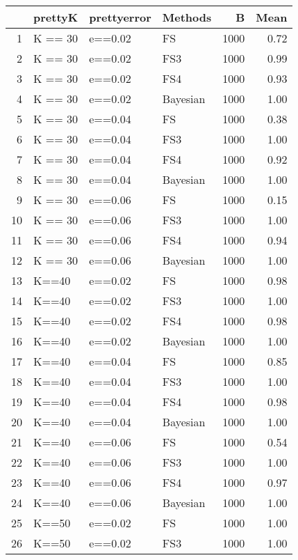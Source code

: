 \begin{table}[ht]
\centering
\begin{tabular}{rlllrr}
  \hline
 & prettyK & prettyerror & Methods & B & Mean \\ 
  \hline
1 & K == 30 & e==0.02 & FS & 1000 & 0.72 \\ 
  2 & K == 30 & e==0.02 & FS3 & 1000 & 0.99 \\ 
  3 & K == 30 & e==0.02 & FS4 & 1000 & 0.93 \\ 
  4 & K == 30 & e==0.02 & Bayesian & 1000 & 1.00 \\ 
  5 & K == 30 & e==0.04 & FS & 1000 & 0.38 \\ 
  6 & K == 30 & e==0.04 & FS3 & 1000 & 1.00 \\ 
  7 & K == 30 & e==0.04 & FS4 & 1000 & 0.92 \\ 
  8 & K == 30 & e==0.04 & Bayesian & 1000 & 1.00 \\ 
  9 & K == 30 & e==0.06 & FS & 1000 & 0.15 \\ 
  10 & K == 30 & e==0.06 & FS3 & 1000 & 1.00 \\ 
  11 & K == 30 & e==0.06 & FS4 & 1000 & 0.94 \\ 
  12 & K == 30 & e==0.06 & Bayesian & 1000 & 1.00 \\ 
  13 & K==40 & e==0.02 & FS & 1000 & 0.98 \\ 
  14 & K==40 & e==0.02 & FS3 & 1000 & 1.00 \\ 
  15 & K==40 & e==0.02 & FS4 & 1000 & 0.98 \\ 
  16 & K==40 & e==0.02 & Bayesian & 1000 & 1.00 \\ 
  17 & K==40 & e==0.04 & FS & 1000 & 0.85 \\ 
  18 & K==40 & e==0.04 & FS3 & 1000 & 1.00 \\ 
  19 & K==40 & e==0.04 & FS4 & 1000 & 0.98 \\ 
  20 & K==40 & e==0.04 & Bayesian & 1000 & 1.00 \\ 
  21 & K==40 & e==0.06 & FS & 1000 & 0.54 \\ 
  22 & K==40 & e==0.06 & FS3 & 1000 & 1.00 \\ 
  23 & K==40 & e==0.06 & FS4 & 1000 & 0.97 \\ 
  24 & K==40 & e==0.06 & Bayesian & 1000 & 1.00 \\ 
  25 & K==50 & e==0.02 & FS & 1000 & 1.00 \\ 
  26 & K==50 & e==0.02 & FS3 & 1000 & 1.00 \\ 

\end{tabular}
\end{table}
